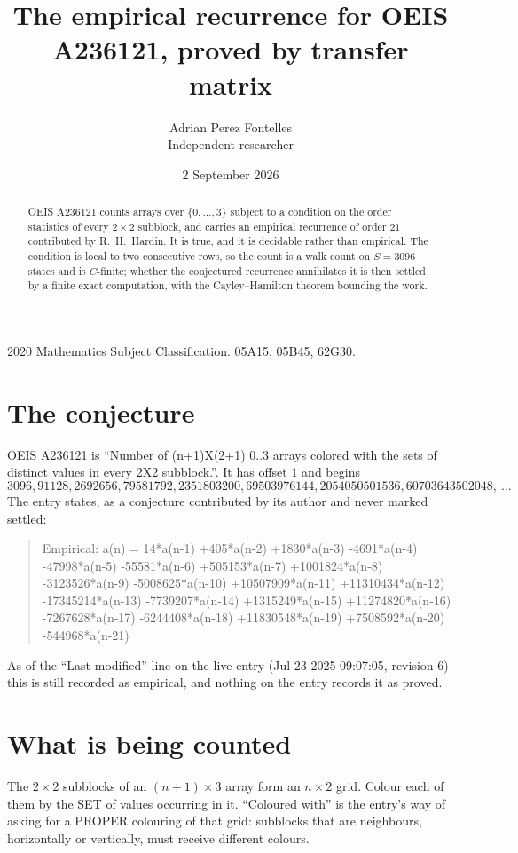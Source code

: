 \documentclass[11pt,a4paper]{article}
\title{The empirical recurrence for OEIS A236121, proved by transfer matrix}
\author{Adrian Perez Fontelles\\ \small Independent researcher}
\date{2 September 2026}
\theoremstyle{plain}
\theoremstyle{definition}
\begin{document}
\maketitle

\begin{abstract}
OEIS A236121 counts arrays over $\{0,\dots,3\}$ subject to a condition on the order
statistics of every $2\times2$ subblock, and carries an empirical recurrence of order
$21$ contributed by R.~H.~Hardin. It is true, and it is decidable rather than empirical.
The condition is local to two consecutive rows, so the count is a walk count on $S=3096$
states and is $C$-finite; whether the conjectured recurrence annihilates it is then settled by
a finite exact computation, with the Cayley--Hamilton theorem bounding the work.
\end{abstract}

\noindent\small 2020 Mathematics Subject Classification. 05A15, 05B45, 62G30.\normalsize

\section{The conjecture}

OEIS A236121 is ``Number of (n+1)X(2+1) 0..3 arrays colored with the sets of distinct values in every 2X2 subblock.''. It has offset $1$ and begins
\[
3096, 91128, 2692656, 79581792, 2351803200, 69503976144, 2054050501536, 60703643502048,\ \dots
\]
The entry states, as a conjecture contributed by its author and never marked settled:
\begin{quote}
Empirical: a(n) = 14*a(n-1) +405*a(n-2) +1830*a(n-3) -4691*a(n-4) -47998*a(n-5) -55581*a(n-6) +505153*a(n-7) +1001824*a(n-8) -3123526*a(n-9) -5008625*a(n-10) +10507909*a(n-11) +11310434*a(n-12) -17345214*a(n-13) -7739207*a(n-14) +1315249*a(n-15) +11274820*a(n-16) -7267628*a(n-17) -6244408*a(n-18) +11830548*a(n-19) +7508592*a(n-20) -544968*a(n-21)
\end{quote}
As of the ``Last modified'' line on the live entry (Jul 23 2025 09:07:05, revision 6) this is still
recorded as empirical, and nothing on the entry records it as proved.

\section{What is being counted}

The $2\times2$ subblocks of an $(n+1)\times3$ array form an
$n\times2$ grid. Colour each of them by the SET of values occurring in it. ``Coloured with'' is the entry's way of
asking for a PROPER colouring of that grid: subblocks that are neighbours, horizontally or
vertically, must receive different colours.
\end{document}
